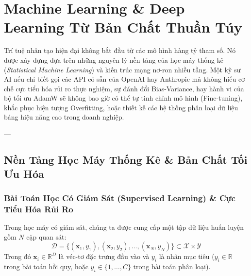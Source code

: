
\chapter{Machine Learning \& Deep Learning Từ Bản Chất Thuần Túy}
\label{ch:machine-learning-deepdive}

Trí tuệ nhân tạo hiện đại không bắt đầu từ các mô hình hàng tỷ tham số. Nó được xây dựng dựa trên những nguyên lý nền tảng của học máy thống kê (\textit{Statistical Machine Learning}) và kiến trúc mạng nơ-ron nhiều tầng. Một kỹ sư AI nếu chỉ biết gọi các API có sẵn của OpenAI hay Anthropic mà không hiểu cơ chế cực tiểu hóa rủi ro thực nghiệm, sự đánh đổi Bias-Variance, hay hành vi của bộ tối ưu AdamW sẽ không bao giờ có thể tự tinh chỉnh mô hình (Fine-tuning), khắc phục hiện tượng Overfitting, hoặc thiết kế các hệ thống phân loại dữ liệu bảng hiệu năng cao trong doanh nghiệp.

---

\section{Nền Tảng Học Máy Thống Kê \& Bản Chất Tối Ưu Hóa}
\label{sec:statistical-ml-foundations}

\subsection{Bài Toán Học Có Giám Sát (Supervised Learning) \& Cực Tiểu Hóa Rủi Ro}

Trong học máy có giám sát, chúng ta được cung cấp một tập dữ liệu huấn luyện gồm $N$ cặp quan sát:
\begin{equation}
\mathcal{D} = \{(\mathbf{x}_1, y_1), (\mathbf{x}_2, y_2), \dots, (\mathbf{x}_N, y_N)\} \subset \mathcal{X} \times \mathcal{Y}
\end{equation}
Trong đó $\mathbf{x}_i \in \mathbb{R}^D$ là véc-tơ đặc trưng đầu vào và $y_i$ là nhãn mục tiêu ($y_i \in \mathbb{R}$ trong bài toán hồi quy, hoặc $y_i \in \{1, \dots, C\}$ trong bài toán phân loại).

